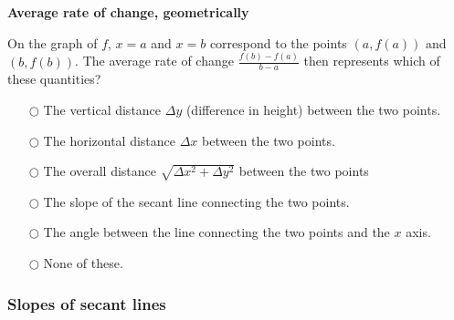 \documentclass[pdftex, brazil, 12pt, twoside]{article}
\begin{document}
\begin{exercise}
  \textbf{Average rate of change, geometrically}\\%
  \begin{figure}[H]
    \begin{center}
    \end{center}
  \end{figure}
  On the graph of $f$, $x=a$ and $x=b$ correspond to the points $(a, f(a))$ and $(b, f(b))$.
  The average rate of change $\frac{f(b)-f(a)}{b-a}$ then represents which of these
  quantities?
  \begin{itemize}
  \item[$\bigcirc$] The vertical distance $\Delta y$ (difference in height) between the two points.
  \item[$\bigcirc$] The horizontal distance $\Delta x$ between the two points.
  \item[$\bigcirc$] The overall distance $\sqrt{\Delta x^2 + \Delta y^2}$ between the two points
  \item[$\bigcirc$] The slope of the secant line connecting the two points.
  \item[$\bigcirc$] The angle between the line connecting the two points and the $x$ axis.
  \item[$\bigcirc$] None of these.
  \end{itemize}
\end{exercise}

\subsubsection{Slopes of secant lines}
\label{u1-geometric-slope-secant-lines}
\end{document}

